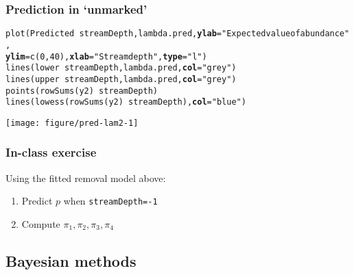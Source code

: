 \documentclass[color=usenames,dvipsnames]{beamer}\usepackage[]{graphicx}\usepackage[]{color}
\makeatletter
\newcommand{\hlnum}[1]{\textcolor[rgb]{0.69,0.494,0}{#1}}%
\newcommand{\hlstr}[1]{\textcolor[rgb]{0.749,0.012,0.012}{#1}}%
\newcommand{\hlopt}[1]{\textcolor[rgb]{0,0,0}{#1}}%
\newcommand{\hlstd}[1]{\textcolor[rgb]{0,0,0}{#1}}%
\newcommand{\hlkwc}[1]{\textcolor[rgb]{0,0,0}{\textbf{#1}}}%
\newcommand{\hlkwd}[1]{\textcolor[rgb]{0.004,0.004,0.506}{#1}}%
\newenvironment{kframe}{%
 \def\at@end@of@kframe{}%
 \ifinner\ifhmode%
  \def\at@end@of@kframe{\end{minipage}}%
  \begin{minipage}{\columnwidth}%
 \fi\fi%
 \def\FrameCommand##1{\hskip\@totalleftmargin \hskip-\fboxsep
 \colorbox{shadecolor}{##1}\hskip-\fboxsep
     \hskip-\linewidth \hskip-\@totalleftmargin \hskip\columnwidth}%
 \MakeFramed {\advance\hsize-\width
   \@totalleftmargin\z@ \linewidth\hsize
   \@setminipage}}%
 {\par\unskip\endMakeFramed%
 \at@end@of@kframe}
\newenvironment{knitrout}{}{} %
\makeatother
\begin{document}
\begin{frame}[fragile]
  \frametitle{Prediction in `unmarked'}
\begin{knitrout}\tiny
{}\color{fgcolor}\begin{kframe}
\begin{alltt}
\hlkwd{plot}\hlstd{(Predicted} \hlopt{~} \hlstd{streamDepth, lambda.pred,} \hlkwc{ylab}\hlstd{=}\hlstr{"Expected value of abundance"}\hlstd{,}
     \hlkwc{ylim}\hlstd{=}\hlkwd{c}\hlstd{(}\hlnum{0}\hlstd{,}\hlnum{40}\hlstd{),} \hlkwc{xlab}\hlstd{=}\hlstr{"Stream depth"}\hlstd{,} \hlkwc{type}\hlstd{=}\hlstr{"l"}\hlstd{)}
\hlkwd{lines}\hlstd{(lower} \hlopt{~} \hlstd{streamDepth, lambda.pred,} \hlkwc{col}\hlstd{=}\hlstr{"grey"}\hlstd{)}
\hlkwd{lines}\hlstd{(upper} \hlopt{~} \hlstd{streamDepth, lambda.pred,} \hlkwc{col}\hlstd{=}\hlstr{"grey"}\hlstd{)}
\hlkwd{points}\hlstd{(}\hlkwd{rowSums}\hlstd{(y2)}\hlopt{~}\hlstd{streamDepth)}
\hlkwd{lines}\hlstd{(}\hlkwd{lowess}\hlstd{(}\hlkwd{rowSums}\hlstd{(y2)}\hlopt{~}\hlstd{streamDepth),} \hlkwc{col}\hlstd{=}\hlstr{"blue"}\hlstd{)}
\end{alltt}
\end{kframe}

{\centering \texttt{[image: figure/pred-lam2-1]} 

}



\end{knitrout}
\end{frame}







\begin{frame}[fragile]
  \frametitle{In-class exercise}
  \large
  Using the fitted removal model above:
  \begin{enumerate}
    \normalsize
    \item Predict $p$ when \verb+streamDepth=-1+
    \item Compute $\pi_1, \pi_2, \pi_3, \pi_4$
  \end{enumerate}
\end{frame}


\subsection{Bayesian methods}
\end{document}

